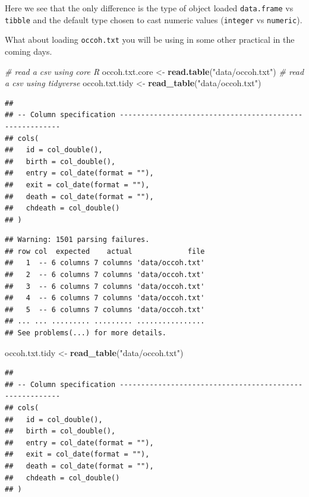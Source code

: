 \documentclass[
]{book}
\newenvironment{Shaded}{\begin{snugshade}}{\end{snugshade}}
\newcommand{\CommentTok}[1]{\textcolor[rgb]{0.56,0.35,0.01}{\textit{#1}}}
\newcommand{\FunctionTok}[1]{\textcolor[rgb]{0.13,0.29,0.53}{\textbf{#1}}}
\newcommand{\NormalTok}[1]{#1}
\newcommand{\OtherTok}[1]{\textcolor[rgb]{0.56,0.35,0.01}{#1}}
\newcommand{\StringTok}[1]{\textcolor[rgb]{0.31,0.60,0.02}{#1}}
\begin{document}
Here we see that the only difference is the type of object loaded \texttt{data.frame} vs \texttt{tibble} and the default type chosen to cast numeric values (\texttt{integer} vs \texttt{numeric}).

What about loading \texttt{occoh.txt} you will be using in some other practical in the coming days.

\begin{Shaded}
\begin{Highlighting}[]
\CommentTok{\# read a csv using core R}
\NormalTok{occoh.txt.core }\OtherTok{\textless{}{-}} \FunctionTok{read.table}\NormalTok{(}\StringTok{"data/occoh.txt"}\NormalTok{)}
\CommentTok{\# read a csv using tidyverse}
\NormalTok{occoh.txt.tidy }\OtherTok{\textless{}{-}} \FunctionTok{read\_table}\NormalTok{(}\StringTok{"data/occoh.txt"}\NormalTok{)}
\end{Highlighting}
\end{Shaded}

\begin{verbatim}
## 
## -- Column specification --------------------------------------------------------
## cols(
##   id = col_double(),
##   birth = col_double(),
##   entry = col_date(format = ""),
##   exit = col_date(format = ""),
##   death = col_date(format = ""),
##   chdeath = col_double()
## )
\end{verbatim}

\begin{verbatim}
## Warning: 1501 parsing failures.
## row col  expected    actual             file
##   1  -- 6 columns 7 columns 'data/occoh.txt'
##   2  -- 6 columns 7 columns 'data/occoh.txt'
##   3  -- 6 columns 7 columns 'data/occoh.txt'
##   4  -- 6 columns 7 columns 'data/occoh.txt'
##   5  -- 6 columns 7 columns 'data/occoh.txt'
## ... ... ......... ......... ................
## See problems(...) for more details.
\end{verbatim}

\begin{Shaded}
\begin{Highlighting}[]
\NormalTok{occoh.txt.tidy }\OtherTok{\textless{}{-}} \FunctionTok{read\_table}\NormalTok{(}\StringTok{"data/occoh.txt"}\NormalTok{)}
\end{Highlighting}
\end{Shaded}

\begin{verbatim}
## 
## -- Column specification --------------------------------------------------------
## cols(
##   id = col_double(),
##   birth = col_double(),
##   entry = col_date(format = ""),
##   exit = col_date(format = ""),
##   death = col_date(format = ""),
##   chdeath = col_double()
## )
\end{verbatim}
\end{document}
